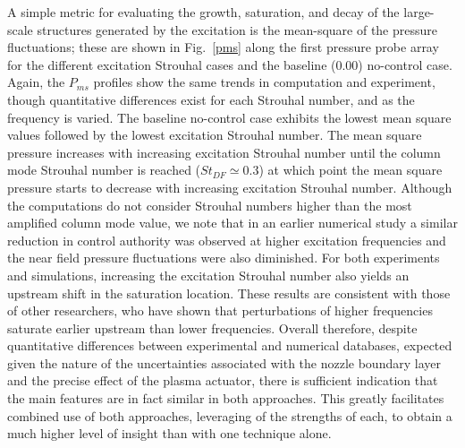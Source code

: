 \documentclass[english]{aiaa-tc}
\begin{document}
A simple metric for evaluating the growth, saturation, and decay of
the large-scale structures generated by the excitation is the
mean-square of the pressure fluctuations; these are shown in
Fig.~\ref{pms} along the first pressure probe array for the different
excitation Strouhal cases and the baseline (0.00) no-control
case. Again, the $P_{ms}$ profiles show the same trends in computation
and experiment, though quantitative differences exist for each
Strouhal number, and as the frequency is varied. The baseline no-control case exhibits the lowest mean square
values followed by the lowest excitation Strouhal number. The mean 
square pressure increases with increasing excitation Strouhal number
until the column mode Strouhal number is reached ($St_{DF} \simeq
0.3$) at which point the mean square pressure starts to decrease with
increasing excitation Strouhal number. Although the computations do
not consider Strouhal numbers higher than the most amplified column
mode value, we note that in an earlier numerical study
a similar reduction in control authority was observed at higher
excitation frequencies\cite{SpethCF2013}
and the near field pressure fluctuations were also
diminished\cite{GaitondeJPropPower2012}.  For both experiments and
simulations, increasing the excitation Strouhal number also yields an
upstream shift in the saturation location. These results are
consistent with those of other researchers, who have shown that
perturbations of higher frequencies saturate earlier upstream than
lower frequencies\cite{Suzuki2006,Ukeiley2004}. Overall therefore,
despite quantitative differences between experimental and
numerical databases, expected given the nature of the
uncertainties associated with the nozzle boundary layer and the
precise effect of the plasma actuator, there is sufficient indication
that the main features are in fact similar in both approaches.  This
greatly facilitates combined use of both approaches, leveraging of the
strengths of each, to obtain a much higher level of insight than with
one technique alone.
\end{document}
